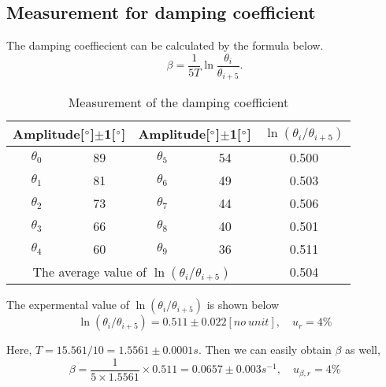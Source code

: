 \subsection{Measurement for damping coefficient}
    The damping coeffiecient can be calculated by the formula below.
    \[
        \beta=\frac{1}{5T}\ln\frac{\theta_i}{\theta_{i+5}}.
    \]
    \begin{table}[H] \small
        \centering
        \begin{tabular}{|c|c|c|c|c|}
        \hline
            \multicolumn{2}{|c}{Amplitude[$^\circ$]$\pm$1[$^\circ$]} & 
            \multicolumn{2}{|c|}{Amplitude[$^\circ$]$\pm$1[$^\circ$]} &
            $\ln(\theta_i/\theta_{i+5})$\\\hline
            $\theta_0$ & 89 & $\theta_5$ & 54 & 0.500\\\hline
            $\theta_1$ & 81 & $\theta_6$ & 49 & 0.503\\\hline
            $\theta_2$ & 73 & $\theta_7$ & 44 & 0.506\\\hline
            $\theta_3$ & 66 & $\theta_8$ & 40 & 0.501\\\hline
            $\theta_4$ & 60 & $\theta_9$ & 36 & 0.511\\\hline
            \multicolumn{4}{|c|}{The average value of $\ln(\theta_i/\theta_{i+5})$} & 0.504\\\hline
        \end{tabular}
        \caption{Measurement of the damping coefficient}\label{data_damping}
    \end{table}

    The expermental value of $\ln(\theta_i/\theta_{i+5})$ is shown below
    \[
        \ln(\theta_i/\theta_{i+5})=0.511\pm0.022 [no\ unit], \quad u_r=4\%
    \]

    Here, $T=15.561/10=1.5561\pm0.0001s$. Then we can easily obtain $\beta$ as well,
    \[
        \beta=\frac{1}{5\times1.5561}\times0.511=0.0657\pm 0.003s^{-1}, \quad u_{\beta,r}=4\%
    \]

